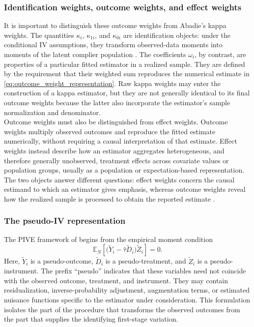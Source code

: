 \documentclass[12pt, a4paper, oneside]{article}
\theoremstyle{plain}
\theoremstyle{definition}
\begin{document}
\subsubsection{Identification weights, outcome weights, and effect weights}

It is important to distinguish these outcome weights from Abadie's kappa
weights. The quantities \(\kappa_i\), \(\kappa_{1i}\), and \(\kappa_{0i}\) are
identification objects: under the conditional IV assumptions, they transform
observed-data moments into moments of the latent complier population
\citep{abadie2003semiparametric}. The coefficients \(\omega_i\), by contrast,
are properties of a particular fitted estimator in a realized sample. They are
defined by the requirement that their weighted sum reproduces the numerical
estimate in \eqref{eq:outcome_weight_representation}. Raw kappa weights may enter
the construction of a kappa estimator, but they are not generally identical to
its final outcome weights because the latter also incorporate the estimator's
sample normalization and denominator.\\
Outcome weights must also be distinguished from effect weights. Outcome weights
multiply observed outcomes and reproduce the fitted estimate numerically, without
requiring a causal interpretation of that estimate. Effect weights instead
describe how an estimator aggregates heterogeneous, and therefore generally
unobserved, treatment effects across covariate values or population groups,
usually as a population or expectation-based representation. The two objects
answer different questions: effect weights concern the causal estimand to which
an estimator gives emphasis, whereas outcome weights reveal how the realized
sample is processed to obtain the reported estimate
\citep[Section~1.1]{knaus2024treatment}. 



\subsubsection{The pseudo-IV representation}

The PIVE framework of \citet{knaus2024treatment} begins from the empirical
moment condition
\begin{equation}
    \mathbb{E}_N\!\left[
      \bigl(\widetilde{Y}_i-\widehat{\tau}\widetilde{D}_i\bigr)
      \widetilde{Z}_i
    \right]=0.
    \label{eq:pive_moment_thesis}
\end{equation}
Here, \(\widetilde{Y}_i\) is a pseudo-outcome, \(\widetilde{D}_i\) is a
pseudo-treatment, and \(\widetilde{Z}_i\) is a pseudo-instrument. The prefix
``pseudo'' indicates that these variables need not coincide with the observed
outcome, treatment, and instrument. They may contain residualization,
inverse-probability adjustment, augmentation terms, or estimated nuisance
functions specific to the estimator under consideration. This formulation
isolates the part of the procedure that transforms the observed outcomes from
the part that supplies the identifying first-stage variation.
\end{document}
